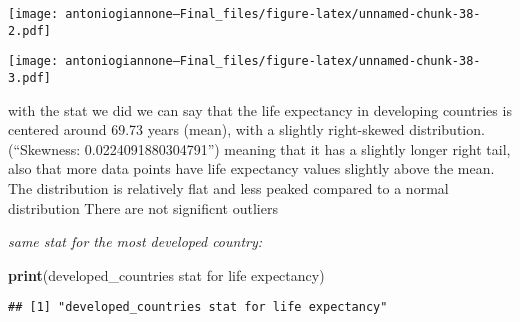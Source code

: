 \documentclass[
]{article}
\newenvironment{Shaded}{\begin{snugshade}}{\end{snugshade}}
\newcommand{\AttributeTok}[1]{\textcolor[rgb]{0.13,0.29,0.53}{#1}}
\newcommand{\CommentTok}[1]{\textcolor[rgb]{0.56,0.35,0.01}{\textit{#1}}}
\newcommand{\FunctionTok}[1]{\textcolor[rgb]{0.13,0.29,0.53}{\textbf{#1}}}
\newcommand{\NormalTok}[1]{#1}
\newcommand{\SpecialCharTok}[1]{\textcolor[rgb]{0.81,0.36,0.00}{\textbf{#1}}}
\newcommand{\StringTok}[1]{\textcolor[rgb]{0.31,0.60,0.02}{#1}}
\begin{document}
\begin{Shaded}
\end{Shaded}

\texttt{[image: antoniogiannone---Final\_files/figure-latex/unnamed-chunk-38-2.pdf]}

\begin{Shaded}
\end{Shaded}

\texttt{[image: antoniogiannone---Final\_files/figure-latex/unnamed-chunk-38-3.pdf]}

with the stat we did we can say that the life expectancy in developing
countries is centered around 69.73 years (mean), with a slightly
right-skewed distribution.(``Skewness: 0.0224091880304791'') meaning
that it has a slightly longer right tail, also that more data points
have life expectancy values slightly above the mean. The distribution is
relatively flat and less peaked compared to a normal distribution There
are not significnt outliers

\emph{same stat for the most developed country:}

\begin{Shaded}
\begin{Highlighting}[]
\FunctionTok{print}\NormalTok{(}\StringTok{\textquotesingle{}developed\_countries stat for life expectancy\textquotesingle{}}\NormalTok{)}
\end{Highlighting}
\end{Shaded}

\begin{verbatim}
## [1] "developed_countries stat for life expectancy"
\end{verbatim}
\end{document}
